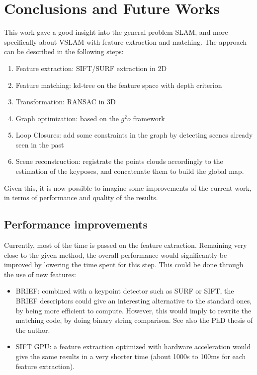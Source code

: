 \chapter{Conclusions and Future Works}
\label{chap:conclusion}

This work gave a good insight into the general problem \gls{SLAM}, and more specifically about \gls{VSLAM} with feature extraction and matching. The approach can be described in the following steps:
\begin{enumerate}
\item Feature extraction: \gls{SIFT}/\gls{SURF} extraction in 2D
\item Feature matching: kd-tree on the feature space with depth criterion
\item Transformation: \gls{RANSAC} in 3D
\item Graph optimization: based on the $g^2o$ framework
\item Loop Closures: add some constraints in the graph by detecting scenes already seen in the past
\item Scene reconstruction: registrate the points clouds accordingly to the estimation of the keyposes, and concatenate them to build the global map.
\end{enumerate}

Given this, it is now possible to imagine some improvements of the current work, in terms of performance and quality of the results.

\section{Performance improvements}

Currently, most of the time is passed on the feature extraction. Remaining very close to the given method, the overall performance would significantly be improved by lowering the time spent for this step. This could be done through the use of new features:
\begin{itemize}
\item BRIEF: combined with a keypoint detector such as \gls{SURF} or \gls{SIFT}, the \gls{BRIEF} descriptors\cite{Calonder10-brief} could give an interesting alternative to the standard ones, by being more efficient to compute. However, this would imply to rewrite the matching code, by doing binary string comparison. See also the PhD thesis of the author\cite{Calonder10_PhD}.
\item SIFT GPU: a feature extraction optimized with hardware acceleration would give the same results in a very shorter time (about 1000s to 100ms for each feature extraction).
\end{itemize}

